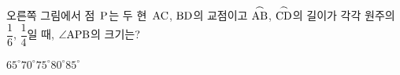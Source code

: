 \noindent\begin{minipage}[t]{0.58\linewidth}\vspace{0pt}\raggedright 오른쪽 그림에서 점~$\mathrm{P}$는 두 현~$\mathrm{AC}$, $\mathrm{BD}$의 교점이고 $\overset{\frown}{\mathrm{AB}}$, $\overset{\frown}{\mathrm{CD}}$의 길이가 각각 원주의 $\dfrac{1}{6}$, $\dfrac{1}{4}$일 때, $\angle\mathrm{APB}$의 크기는?\end{minipage}\hfill\begin{minipage}[t]{0.4\linewidth}\vspace{0pt}\centering \resizebox{\ifdim\width>\linewidth\linewidth\else\width\fi}{!}{}\end{minipage}\par
\begin{choices32}{$65^\circ$}{$70^\circ$}{$75^\circ$}{$80^\circ$}{$85^\circ$}\end{choices32}
